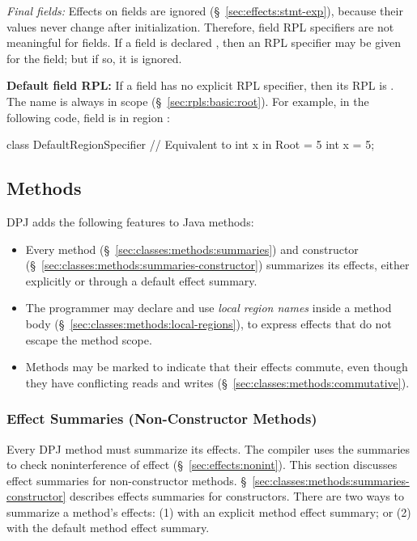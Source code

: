 \noindent
\emph{Final fields:} Effects on  fields are ignored
(\S~\ref{sec:effects:stmt-exp}), because their values never change
after initialization.  Therefore, field RPL specifiers are not
meaningful for  fields.  If a field is declared
, then an RPL specifier may be given for the field; but if
so, it is ignored.

\noindent
\textbf{Default field RPL:} If a field has no explicit RPL specifier,
then its RPL is .  The name  is always in scope
(\S~\ref{sec:rpls:basic:root}).  For example, in the following code,
field  is in region :
%
\begin{dpjlisting}
class DefaultRegionSpecifier {
    // Equivalent to int x in Root = 5
    int x = 5;
}
\end{dpjlisting}


\subsection{Methods%
\label{sec:classes:methods}}

DPJ adds the following features to Java methods:
%
\begin{itemize}
%
\item Every method (\S~\ref{sec:classes:methods:summaries}) and
  constructor (\S~\ref{sec:classes:methods:summaries-constructor})
  summarizes its effects, either explicitly or through a default
  effect summary.
%
\item The programmer may declare and use \emph{local region names}
  inside a method body (\S~\ref{sec:classes:methods:local-regions}),
  to express effects that do not escape the method scope.
%
\item Methods may be marked  to indicate that their
  effects commute, even though they have conflicting reads and writes
  (\S~\ref{sec:classes:methods:commutative}).
%
\end{itemize}

\subsubsection{Effect Summaries (Non-Constructor Methods)%
\label{sec:classes:methods:summaries}}

Every DPJ method must summarize its effects.  The compiler uses the
summaries to check noninterference of effect
(\S~\ref{sec:effects:nonint}).  This section discusses effect
summaries for non-constructor methods.
\S~\ref{sec:classes:methods:summaries-constructor} describes effects
summaries for constructors.  There are two ways to summarize a
method's effects: (1) with an explicit method effect summary; or (2)
with the default method effect summary.

